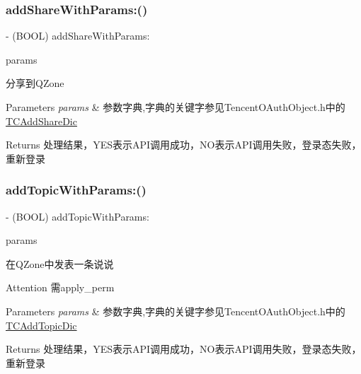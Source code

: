 \subsubsection{\texorpdfstring{add\+Share\+With\+Params\+:()}{addShareWithParams:()}\hspace{0.1cm}{\footnotesize\ttfamily [2/2]}}
{\footnotesize\ttfamily -\/ (B\+O\+OL) add\+Share\+With\+Params\+: \begin{DoxyParamCaption}\item[{(N\+S\+Mutable\+Dictionary $\ast$)}]{params }\end{DoxyParamCaption}}

分享到\+Q\+Zone 
\begin{DoxyParams}{Parameters}
{\em params} & 参数字典,字典的关键字参见\+Tencent\+O\+Auth\+Object.\+h中的\mbox{\hyperlink{interface_t_c_add_share_dic}{T\+C\+Add\+Share\+Dic}} \\
\hline
\end{DoxyParams}
\begin{DoxyReturn}{Returns}
处理结果，\+Y\+E\+S表示\+A\+P\+I调用成功，\+N\+O表示\+A\+P\+I调用失败，登录态失败，重新登录 
\end{DoxyReturn}
\mbox{\label{interface_tencent_o_auth_a501c96fc5ebf901a0faa3a83998f372d}} 
\subsubsection{\texorpdfstring{add\+Topic\+With\+Params\+:()}{addTopicWithParams:()}\hspace{0.1cm}{\footnotesize\ttfamily [1/2]}}
{\footnotesize\ttfamily -\/ (B\+O\+OL) add\+Topic\+With\+Params\+: \begin{DoxyParamCaption}\item[{(N\+S\+Mutable\+Dictionary $\ast$)}]{params }\end{DoxyParamCaption}}

在\+Q\+Zone中发表一条说说 \begin{DoxyAttention}{Attention}
需apply\+\_\+perm 
\end{DoxyAttention}

\begin{DoxyParams}{Parameters}
{\em params} & 参数字典,字典的关键字参见\+Tencent\+O\+Auth\+Object.\+h中的\mbox{\hyperlink{interface_t_c_add_topic_dic}{T\+C\+Add\+Topic\+Dic}} \\
\hline
\end{DoxyParams}
\begin{DoxyReturn}{Returns}
处理结果，\+Y\+E\+S表示\+A\+P\+I调用成功，\+N\+O表示\+A\+P\+I调用失败，登录态失败，重新登录 
\end{DoxyReturn}
\mbox{\label{interface_tencent_o_auth_a501c96fc5ebf901a0faa3a83998f372d}} 
